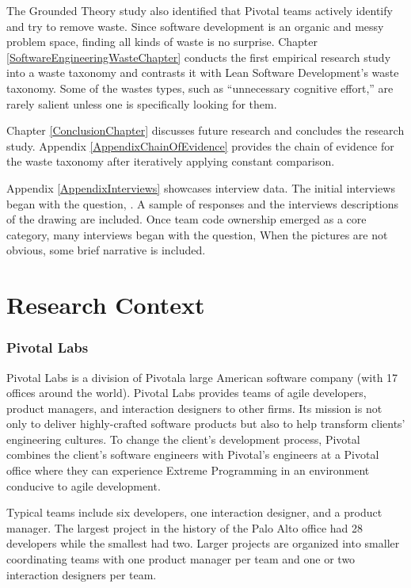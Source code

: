 The Grounded Theory study also identified that Pivotal teams actively identify and try to remove waste. Since software development is an organic and messy problem space, finding all kinds of waste is no surprise.  Chapter \ref{SoftwareEngineeringWasteChapter} conducts the first empirical research study into a waste taxonomy and contrasts it with Lean Software Development's waste taxonomy. Some of the wastes types, such as “unnecessary cognitive effort,” are rarely salient unless one is specifically looking for them. 

Chapter \ref{ConclusionChapter} discusses future research and concludes the research study. 
Appendix \ref{AppendixChainOfEvidence} provides the chain of evidence for the waste taxonomy after iteratively applying constant comparison. 


Appendix \ref{AppendixInterviews} showcases interview data. The initial interviews began with the question, . A sample of responses and the interviews descriptions of the drawing are included. Once team code ownership emerged as a core category, many interviews began with the question,  When the pictures are not obvious, some brief narrative is included.




\chapter{Research Context}
\label{ResearchContextChapter}


\subsection{Pivotal Labs}
Pivotal Labs is a division of Pivotal\textemdash a large American software company (with 17 offices around the world). Pivotal Labs provides teams of agile developers, product managers, and interaction designers to other firms. Its mission is not only to deliver highly-crafted software products but also to help transform clients' engineering cultures. To change the client's development process, Pivotal combines the client's software engineers with Pivotal's engineers at a Pivotal office where they can experience Extreme Programming \cite{BeckExtremeProgramming2004} in an environment conducive to agile development. 


Typical teams include six developers, one interaction designer, and a product manager. The largest project in the history of the Palo Alto office had 28 developers while the smallest had two. Larger projects are organized into smaller coordinating teams with one product manager per team and one or two interaction designers per team.


